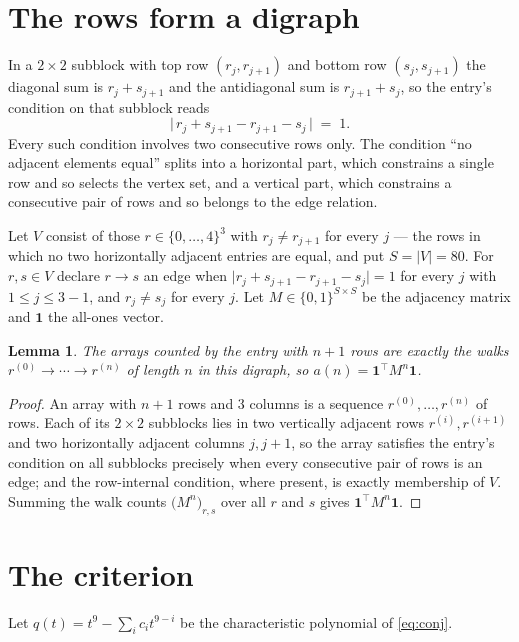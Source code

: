 \documentclass[11pt,a4paper]{article}
\theoremstyle{plain}
\newtheorem{lemma}[theorem]{Lemma}
\theoremstyle{definition}
\begin{document}
\section{The rows form a digraph}

In a $2\times2$ subblock with top row $(r_j,r_{j+1})$ and bottom row $(s_j,s_{j+1})$ the
diagonal sum is $r_j+s_{j+1}$ and the antidiagonal sum is $r_{j+1}+s_j$, so the entry's
condition on that subblock reads
\[
\bigl|\,r_j+s_{j+1}-r_{j+1}-s_j\,\bigr|\;=\;1.
\]
Every such condition involves two consecutive rows only. The condition ``no adjacent elements equal'' splits into a horizontal
part, which constrains a single row and so selects the vertex set, and a vertical part,
which constrains a consecutive pair of rows and so belongs to the edge relation.

Let $V$ consist of those $r\in\{0,\dots,4\}^{3}$ with $r_j\ne r_{j+1}$ for every
$j$ --- the rows in which no two horizontally adjacent entries are equal, and put $S=|V|=80$. For $r,s\in V$ declare $r\to s$ an edge
when $\bigl|r_j+s_{j+1}-r_{j+1}-s_j\bigr|=1$ for every $j$ with
$1\le j\le3-1$, and $r_j\ne s_j$ for every $j$. Let $M\in\{0,1\}^{S\times S}$ be the adjacency matrix and $\mathbf{1}$
the all-ones vector.

\begin{lemma}\label{lem:walk}
The arrays counted by the entry with $n+1$ rows are exactly the walks
$r^{(0)}\to\cdots\to r^{(n)}$ of length $n$ in this digraph, so
$a(n)=\mathbf{1}^{\!\top}M^{n}\mathbf{1}$.
\end{lemma}

\begin{proof}
An array with $n+1$ rows and $3$ columns is a sequence $r^{(0)},\dots,r^{(n)}$ of
rows. Each of its $2\times2$ subblocks lies in two vertically adjacent rows
$r^{(i)},r^{(i+1)}$ and two horizontally adjacent columns $j,j+1$, so the array satisfies
the entry's condition on all subblocks precisely when every consecutive pair of rows is an
edge; and the row-internal condition, where present, is exactly membership of $V$. Summing
the walk counts $\bigl(M^{n}\bigr)_{r,s}$ over all $r$ and $s$ gives
$\mathbf{1}^{\!\top}M^{n}\mathbf{1}$.
\end{proof}

\section{The criterion}

Let $q(t)=t^{9}-\sum_i c_i t^{9-i}$ be the characteristic polynomial of
\eqref{eq:conj}.
\end{document}
